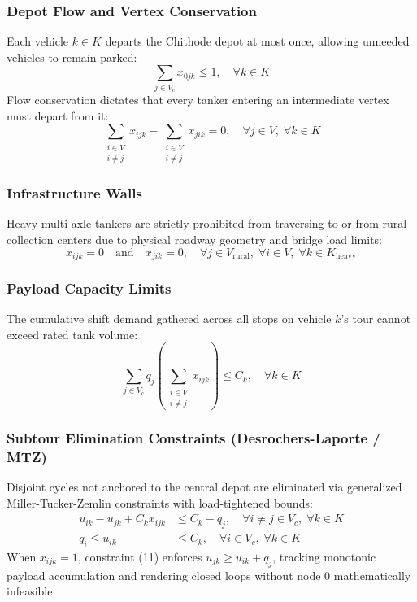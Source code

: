 \documentclass[11pt,a4paper]{article}
\begin{document}
\subsubsection{Depot Flow and Vertex Conservation}
Each vehicle $k \in K$ departs the Chithode depot at most once, allowing unneeded vehicles to remain parked:
\begin{equation}
\sum_{j \in V_c} x_{0jk} \le 1, \quad \forall k \in K
\end{equation}
Flow conservation dictates that every tanker entering an intermediate vertex must depart from it:
\begin{equation}
\sum_{\substack{i \in V \\ i \neq j}} x_{ijk} - \sum_{\substack{i \in V \\ i \neq j}} x_{jik} = 0, \quad \forall j \in V, \; \forall k \in K
\end{equation}

\subsubsection{Infrastructure Walls}
Heavy multi-axle tankers are strictly prohibited from traversing to or from rural collection centers due to physical roadway geometry and bridge load limits:
\begin{equation}
x_{ijk} = 0 \quad \text{and} \quad x_{jik} = 0, \quad \forall j \in V_{\text{rural}}, \; \forall i \in V, \; \forall k \in K_{\text{heavy}}
\end{equation}

\subsubsection{Payload Capacity Limits}
The cumulative shift demand gathered across all stops on vehicle $k$'s tour cannot exceed rated tank volume:
\begin{equation}
\sum_{j \in V_c} q_j \left( \sum_{\substack{i \in V \\ i \neq j}} x_{ijk} \right) \le C_k, \quad \forall k \in K
\end{equation}

\subsubsection{Subtour Elimination Constraints (Desrochers-Laporte / MTZ)}
Disjoint cycles not anchored to the central depot are eliminated via generalized Miller-Tucker-Zemlin constraints with load-tightened bounds:
\begin{align}
u_{ik} - u_{jk} + C_k x_{ijk} &\le C_k - q_j, \quad \forall i \neq j \in V_c, \; \forall k \in K \\
q_i \le u_{ik} &\le C_k, \quad \forall i \in V_c, \; \forall k \in K
\end{align}
When $x_{ijk} = 1$, constraint (11) enforces $u_{jk} \ge u_{ik} + q_j$, tracking monotonic payload accumulation and rendering closed loops without node 0 mathematically infeasible.
\end{document}
